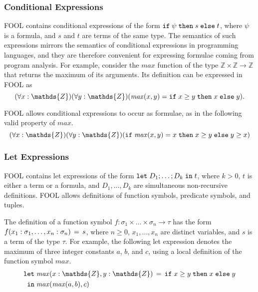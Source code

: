 \subsubsection{Conditional Expressions}
FOOL contains conditional expressions of the form $\mathtt{if}\;{\psi}\;\allowbreak\mathtt{then}\;{s}\;\allowbreak\mathtt{else}\;{t}$, where 
$\psi$ is a formula, and $s$ and $t$ are terms of the same type. 
The semantics of such expressions mirrors the semantics of conditional 
expressions in programming languages, and they are therefore convenient for 
expressing formulae coming from program analysis. 
For example, consider the $\mathit{max}$ function of the type 
$\mathds{Z}\times\mathds{Z}\to\mathds{Z}$ that returns the maximum of its 
arguments. 
Its definition can be expressed in FOOL as
\begin{equation}\label{eq:tfx/ite-t-example}
(\forall x:\mathds{Z})(\forall y:\mathds{Z})
(\mathit{max}(x, y) = \ite{x \geq y}{x}{y}).
\end{equation}

FOOL allows conditional expressions to occur as formulae, as in the
following valid property of $\mathit{max}$.
\begin{equation}\label{eq:tfx/ite-f-example}
(\forall x:\mathds{Z})(\forall y:\mathds{Z})
(\ite{\mathit{max}(x, y) = x}{x \geq y}{y \geq x})
\end{equation}

\subsubsection{Let Expressions}
FOOL contains let expressions of the form $\mathtt{let}\;{D_1;\ldots;D_k}\;\allowbreak\mathtt{in}\;{t}$, where
$k > 0$, $t$ is either a term or a formula, and $D_1,\ldots,D_k$ are
simultaneous non-recursive definitions. FOOL allows definitions of function
symbols, predicate symbols, and tuples.

The definition of a function symbol 
$f:\sigma_1\times\ldots\times\sigma_n\to\tau$ has the form 
${f(x_1:\sigma_1,\ldots,x_n:\sigma_n)}\,=\,{s}$, where
$n \geq 0$, $x_1,\ldots,x_n$ are distinct variables, and $s$ is a term of the type $\tau$.
For example, the following let expression denotes the maximum of three 
integer constants $a$, $b$, and $c$, using a local definition of the function 
symbol $\mathit{max}$.
\begin{equation}\label{eq:tfx/fool-let-imply}
\begin{aligned}
\mathtt{let}\;&\binding{\mathit{max}(x:\mathds{Z},y:\mathds{Z})}
                       {\ite{x \geq y}{x}{y}}\\
 \mathtt{in}\;&\mathit{max}(\mathit{max}(a,b),c)
\end{aligned}
\end{equation}


